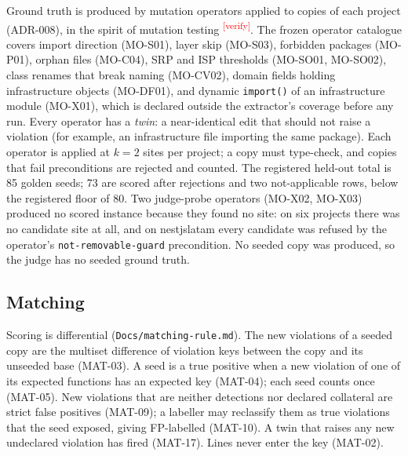 \documentclass[10pt,a4paper]{article}
\newcommand{\citeneeded}[1]{\cite{#1}\textsuperscript{\textcolor{red}{\tiny[verify]}}}
\begin{document}
Ground truth is produced by mutation operators applied to copies of each project (ADR-008), in the spirit of
mutation testing \citeneeded{jia2011mutation}. The frozen operator catalogue covers import direction (MO-S01),
layer skip (MO-S03), forbidden packages (MO-P01), orphan files (MO-C04), SRP and ISP thresholds (MO-SO01, MO-SO02),
class renames that break naming (MO-CV02), domain fields holding infrastructure objects (MO-DF01), and dynamic
\texttt{import()} of an infrastructure module (MO-X01), which is declared outside the extractor's coverage before
any run. %
Every operator has a \emph{twin}: a near-identical edit that should not raise a violation (for example, an
infrastructure file importing the same package). Each operator is applied at $k = 2$ sites per project; a copy must
type-check, and copies that fail preconditions are rejected and counted. The registered held-out total is 85 golden
seeds; 73 are scored after rejections and two not-applicable rows, below the registered floor of 80.
Two judge-probe operators (MO-X02, MO-X03) produced no scored instance because they found no site: on six projects
there was no candidate site at all, and on nestjslatam every candidate was refused by the operator's
\texttt{not-removable-guard} precondition. No seeded copy was produced, so the judge has no seeded ground truth.

\subsection{Matching}

Scoring is differential (\texttt{Docs/matching-rule.md}). The new violations of a seeded copy are the multiset
difference of violation keys between the copy and its unseeded base (MAT-03). A seed is a true positive when a new
violation of one of its expected functions has an expected key (MAT-04); each seed counts once (MAT-05). New
violations that are neither detections nor declared collateral are strict false positives (MAT-09); a labeller may
reclassify them as true violations that the seed exposed, giving FP-labelled (MAT-10). A twin that raises any new
undeclared violation has fired (MAT-17). Lines never enter the key (MAT-02).
\end{document}
